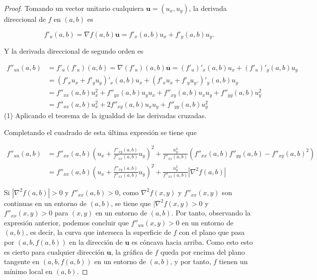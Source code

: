 \documentclass[
  a4paper,
]{scrreport}
\theoremstyle{definition}
\theoremstyle{plain}
\theoremstyle{plain}
\theoremstyle{definition}
\theoremstyle{definition}
\theoremstyle{plain}
\theoremstyle{remark}
\begin{document}
\begin{tcolorbox}[enhanced jigsaw, breakable, title=\textcolor{quarto-callout-note-color}{\faInfo}\hspace{0.5em}{Demostración}, toprule=.15mm, coltitle=black, arc=.35mm, rightrule=.15mm, colframe=quarto-callout-note-color-frame, colbacktitle=quarto-callout-note-color!10!white, toptitle=1mm, titlerule=0mm, leftrule=.75mm, opacityback=0, colback=white, bottomrule=.15mm, bottomtitle=1mm, left=2mm, opacitybacktitle=0.6]

\begin{proof}

Tomando un vector unitario cualquiera \(\mathbf{u}=(u_x,u_y)\), la
derivada direccional de \(f\) en \((a,b)\) es

\[
f'_u(a,b) 
= \nabla f(a,b)\mathbf{u}
= f'_x(a,b)u_x + f'_y(a,b) u_y.
\]

Y la derivada direccional de segundo orden es

\begin{align*}
f''_{uu}(a,b) 
&= f'_u(f'_u)(a,b)
= \nabla (f'_u)(a,b)\mathbf{u} 
= (f'_u)'_x(a,b)u_x + (f'_u)'_y(a,b) u_y \\
&= (f'_x u_x + f'_y u_y)'_x(a,b)u_x + (f'_x u_x + f'_y u_y.)'_y(a,b) u_y \\
&= f''_{xx}(a,b)u_x^2 + f''_{yx}(a,b)u_yu_x + f''_{xy}(a,b)u_xu_y + f''_{yy}(a,b)u_y^2 \\
&= f''_{xx}(a,b)u_x^2 + 2f''_{xy}(a,b)u_xu_y + f''_{yy}(a,b)u_y^2 \tag{1}
\end{align*} (1) Aplicando el teorema de la igualdad de las derivadas
cruzadas.

Completando el cuadrado de esta última expresión se tiene que

\begin{align*}
f''_{uu}(a,b) 
&= f''_{xx}(a,b)\left(u_x+\frac{f''_{xy}(a,b)}{f''_{xx}(a,b)}u_y\right)^2+\frac{u_y^2}{f''_{xx}(a,b)}(f''_{xx}(a,b)f''_{yy}(a,b)-f''_{xy}(a,b)^2) \\
&= f''_{xx}(a,b)\left(u_x+\frac{f''_{xy}(a,b)}{f''_{xx}(a,b)}u_y\right)^2+\frac{u_y^2}{f''_{xx}(a,b)}|\nabla^2 f(a,b)|
\end{align*}

Si \(|\nabla ^2f(a,b)|>0\) y \(f''_{xx}(a,b)>0\), como
\(\nabla ^2f(x,y)\) y \(f''_{xx}(x,y)\) son continuas en un entorno de
\((a,b)\), se tiene que \(|\nabla ^2f(x,y)>0\) y \(f''_{xx}(x,y)>0\)
para \((x,y)\) en un entorno de \((a,b)\). Por tanto, observando la
expresión anterior, podemos concluir que \(f''_{uu}(x,y)>0\) en un
entorno de \((a,b)\), es decir, la curva que interseca la superficie de
\(f\) con el plano que pasa por \((a,b,f(a,b))\) en la dirección de
\(\mathbf{u}\) es cóncava hacia arriba. Como esto esto es cierto para
cualquier dirección \(\mathbf{u}\), la gráfica de \(f\) queda por encima
del plano tangente en \((a,b,f(a,b))\) en un entorno de \((a,b)\), y por
tanto, \(f\) tienen un mínimo local en \((a,b)\).


\end{proof}
\end{tcolorbox}
\end{document}
